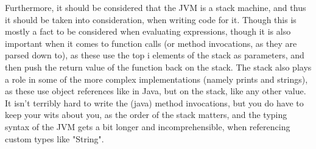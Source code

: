 Furthermore, it should be considered that the JVM is a stack machine, and thus it should be taken into consideration, when writing code for it. Though this is mostly a fact to be considered when evaluating expressions, though it is also important when it comes to function calls (or method invocations, as they are parsed down to), as these use the top i elements of the stack as parameters, and then push the return value of the function back on the stack. The stack also plays a role in some of the more complex implementations (namely prints and strings), as these use object references like in Java, but on the stack, like any other value. It isn't terribly hard to write the (java) method invocations, but you do have to keep your wits about you, as the order of the stack matters, and the typing syntax of the JVM gets a bit longer and incomprehensible, when referencing custom types like "String".
